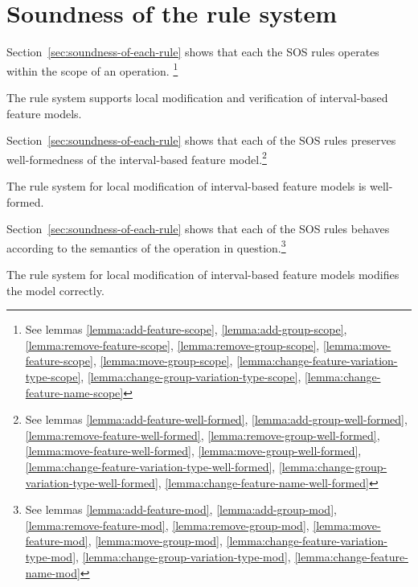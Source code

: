 \section{Soundness of the rule system}
Section~\vref{sec:soundness-of-each-rule} shows that each the SOS rules operates within the scope of an operation. \footnote{See lemmas \ref{lemma:add-feature-scope}, \ref{lemma:add-group-scope}, \ref{lemma:remove-feature-scope}, \ref{lemma:remove-group-scope}, \ref{lemma:move-feature-scope}, \ref{lemma:move-group-scope}, \ref{lemma:change-feature-variation-type-scope}, \ref{lemma:change-group-variation-type-scope}, \ref{lemma:change-feature-name-scope}}
\\
\begin{theorem}
  The rule system supports local modification and verification of interval-based feature models.
\end{theorem}

Section~\vref{sec:soundness-of-each-rule} shows that each of the SOS rules preserves well-formedness of the interval-based feature model.\footnote{See lemmas \ref{lemma:add-feature-well-formed}, \ref{lemma:add-group-well-formed}, \ref{lemma:remove-feature-well-formed}, \ref{lemma:remove-group-well-formed}, \ref{lemma:move-feature-well-formed}, \ref{lemma:move-group-well-formed}, \ref{lemma:change-feature-variation-type-well-formed}, \ref{lemma:change-group-variation-type-well-formed}, \ref{lemma:change-feature-name-well-formed}}
\\
\begin{theorem}
  The rule system for local modification of interval-based feature models is well-formed.
\end{theorem}

Section~\vref{sec:soundness-of-each-rule} shows that each of the SOS rules behaves according to the semantics of the operation in question.\footnote{See lemmas \ref{lemma:add-feature-mod}, \ref{lemma:add-group-mod}, \ref{lemma:remove-feature-mod}, \ref{lemma:remove-group-mod}, \ref{lemma:move-feature-mod}, \ref{lemma:move-group-mod}, \ref{lemma:change-feature-variation-type-mod}, \ref{lemma:change-group-variation-type-mod}, \ref{lemma:change-feature-name-mod}}
\\
\begin{theorem}
  The rule system for local modification of interval-based feature models modifies the model correctly.
\end{theorem}
